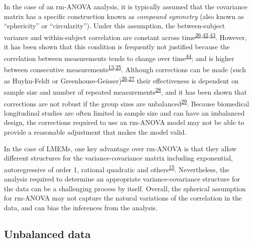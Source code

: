 \documentclass[
]{article}
\begin{document}
In the case of an rm-ANOVA analysis, it is typically assumed that the covariance matrix has a specific construction known as \emph{compound symmetry} (also known as ``sphericity'' or ``circularity''). Under this assumption, the between-subject variance and within-subject correlation are constant across time\textsuperscript{\protect\hyperlink{ref-huynh1976}{26},\protect\hyperlink{ref-weiss2005}{42},\protect\hyperlink{ref-geisser1958}{43}}. However, it has been shown that this condition is frequently not justified because the correlation between measurements tends to change over time\textsuperscript{\protect\hyperlink{ref-maxwell2017}{44}}; and is higher between consecutive measurements\textsuperscript{\protect\hyperlink{ref-gueorguieva2004}{13},\protect\hyperlink{ref-ugrinowitsch2004}{25}}. Although corrections can be made (such as Huyhn-Feldt or Greenhouse-Geisser)\textsuperscript{\protect\hyperlink{ref-huynh1976}{26},\protect\hyperlink{ref-greenhouse1959}{27}} their effectiveness is dependent on sample size and number of repeated measurements\textsuperscript{\protect\hyperlink{ref-haverkamp2017}{28}}, and it has been shown that corrections are not robust if the group sizes are unbalanced\textsuperscript{\protect\hyperlink{ref-keselman2001}{29}}. Because biomedical longitudinal studies are often limited in sample size and can have an imbalanced design, the corrections required to use an rm-ANOVA model may not be able to provide a reasonable adjustment that makes the model valid.

In the case of LMEMs, one key advantage over rm-ANOVA is that they allow different structures for the variance-covariance matrix including exponential, autoregressive of order 1, rational quadratic and others\textsuperscript{\protect\hyperlink{ref-pinheiro2006}{15}}. Nevertheless, the analysis required to determine an appropriate variance-covariance structure for the data can be a challenging process by itself. Overall, the spherical assumption for rm-ANOVA may not capture the natural variations of the correlation in the data, and can bias the inferences from the analysis.

\hypertarget{unbalanced-data}{%
\subsection{Unbalanced data}\label{unbalanced-data}}
\end{document}
